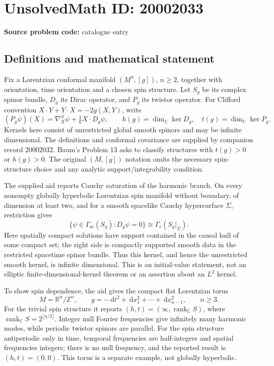 \documentclass[11pt]{article}
\newcommand{\Z}{\mathbb{Z}}
\newcommand{\R}{\mathbb{R}}
\newcommand{\C}{\mathbb{C}}
\newcommand{\dd}{\,\mathrm{d}}
\begin{document}
\section*{UnsolvedMath ID: 20002033}
\textbf{Source problem code:} catalogue entry
\subsection{Definitions and mathematical statement}
Fix a Lorentzian conformal manifold \((M^n,[g])\), \(n\geq2\), together with orientation, time orientation and a chosen spin structure. Let \(S_g\) be its complex spinor bundle, \(D_g\) its Dirac operator, and \(P_g\) its twistor operator. For Clifford convention \(X\cdot Y+Y\cdot X=-2g(X,Y)\), write
\[
(P_g\psi)(X)=\nabla_X^S\psi+\tfrac1nX\cdot D_g\psi,
\qquad
h(g)=\dim_\C\ker D_g,\quad t(g)=\dim_\C\ker P_g.
\]
Kernels here consist of unrestricted global smooth spinors and may be infinite dimensional. The definitions and conformal covariance are supplied by companion record 20002032. Baum's Problem 13 asks to classify structures with \(t(g)>0\) or \(h(g)>0\). The original \((M,[g])\) notation omits the necessary spin-structure choice and any analytic support/integrability condition.

The supplied aid reports Cauchy saturation of the harmonic branch. On every nonempty globally hyperbolic Lorentzian spin manifold without boundary, of dimension at least two, and for a smooth spacelike Cauchy hypersurface \(\Sigma\), restriction gives
\[
\{\psi\in\Gamma_{\mathrm{sc}}(S_g):D_g\psi=0\}
\cong\Gamma_c(S_g|_\Sigma).
\]
Here spatially compact solutions have support contained in the causal hull of some compact set; the right side is compactly supported smooth data in the restricted spacetime spinor bundle. Thus this kernel, and hence the unrestricted smooth kernel, is infinite dimensional. This is an initial-value statement, not an elliptic finite-dimensional-kernel theorem or an assertion about an \(L^2\) kernel.

To show spin dependence, the aid gives the compact flat Lorentzian torus
\[
M=\R^n/\Z^n,\qquad g=-\dd t^2+\dd x_1^2+\cdots+\dd x_{n-1}^2,\qquad n\geq3.
\]
For the trivial spin structure it reports \((h,t)=(\infty,\operatorname{rank}_\C S)\), where \(\operatorname{rank}_\C S=2^{\lfloor n/2\rfloor}\). Integer null Fourier frequencies give infinitely many harmonic modes, while periodic twistor spinors are parallel. For the spin structure antiperiodic only in time, temporal frequencies are half-integers and spatial frequencies integers; there is no null frequency, and the reported result is \((h,t)=(0,0)\). This torus is a separate example, not globally hyperbolic.
\end{document}
